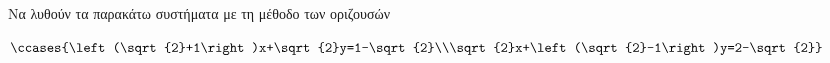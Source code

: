 Να λυθούν τα παρακάτω συστήματα με τη μέθοδο των οριζουσών
\begin{multicols}{2}
\begin{alist}
\item $ \ccases{\left(\sqrt{2}+1\right)x+\sqrt{2}y=1-\sqrt{2}\\\sqrt{2}x+\left(\sqrt{2}-1\right)y=2-\sqrt{2}} $
\end{alist}
\end{multicols}
